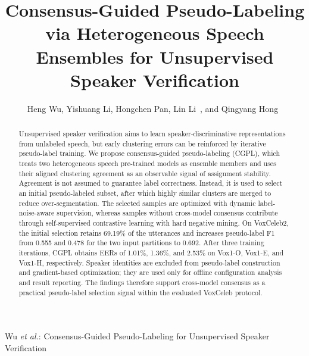 \documentclass[journal]{IEEEtran}
\begin{document}
\title{Consensus-Guided Pseudo-Labeling via Heterogeneous Speech Ensembles for Unsupervised Speaker Verification}

\author{Heng Wu, Yishuang Li, Hongchen Pan, Lin Li~, and Qingyang Hong~
}

%
{Wu \MakeLowercase{\textit{et al.}}: Consensus-Guided Pseudo-Labeling for Unsupervised Speaker Verification}


\maketitle

\begin{abstract}
Unsupervised speaker verification aims to learn speaker-discriminative
representations from unlabeled speech, but early clustering errors can be
reinforced by iterative pseudo-label training. We propose
consensus-guided pseudo-labeling (CGPL), which treats two heterogeneous
speech pre-trained models as ensemble members and uses their aligned
clustering agreement as an observable signal of assignment stability.
Agreement is not assumed to guarantee label correctness. Instead, it is
used to select an initial pseudo-labeled subset, after which highly similar
clusters are merged to reduce over-segmentation. The selected samples are
optimized with dynamic label-noise-aware supervision, whereas samples
without cross-model consensus contribute through self-supervised
contrastive learning with hard negative mining. On VoxCeleb2, the initial
selection retains 69.19\% of the utterances and increases pseudo-label F1
from 0.555 and 0.478 for the two input partitions to 0.692. After three
training iterations, CGPL obtains EERs of 1.01\%, 1.36\%, and 2.53\% on
Vox1-O, Vox1-E, and Vox1-H, respectively. Speaker identities are excluded
from pseudo-label construction and gradient-based optimization; they are
used only for offline configuration analysis and result reporting. The
findings therefore support cross-model consensus as a practical
pseudo-label selection signal within the evaluated VoxCeleb protocol.
\end{abstract}
\end{document}
